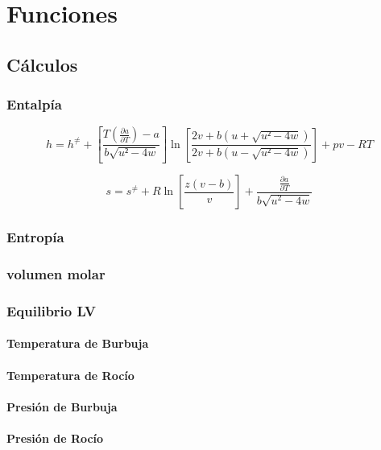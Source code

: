 \chapter{Funciones}
	\section{}
	\section{Cálculos}
		\subsection{Entalpía}
\begin{equation}
h = h^{\neq} + \left[ \frac{T(\frac{\partial a}{\partial T}) - a}{b\sqrt{u²-4w} }\right] 
\ln\left[\frac{2v+b\left(u + \sqrt{u²-4w}\right)}{2v+b\left(u - \sqrt{u²-4w}\right)}\right]
+ pv - RT
\end{equation}

\begin{equation}
s = s^{\neq} + R\ln\left[\frac{z(v-b)}{v}\right] + \frac{\frac{\partial a}{\partial T}}{b \sqrt{u^2 - 4w}}
\end{equation}

		\subsection{Entropía}
		\subsection{volumen molar}
		\subsection{Equilibrio LV}
			\subsubsection{Temperatura de Burbuja}
			\subsubsection{Temperatura de Rocío}
			\subsubsection{Presión de Burbuja}
			\subsubsection{Presión de Rocío}
